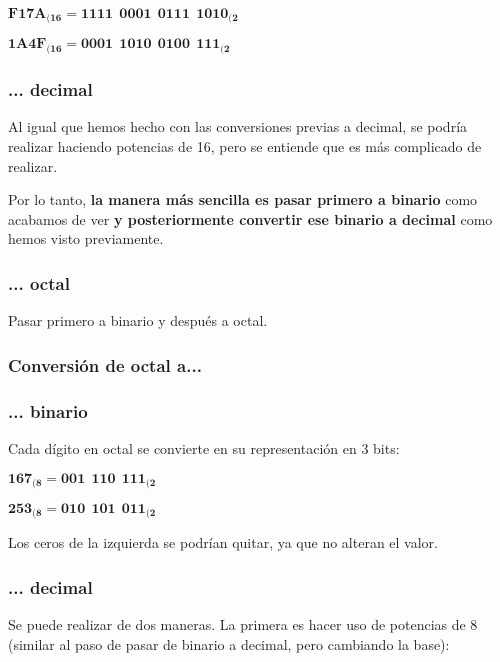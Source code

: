 \begin{center}
    \vspace{-15pt}
    $\mathbf{F17A_{(16} = 1111\ \ 0001\ \ 0111\ \ 1010_{(2}}$

    $\mathbf{1A4F_{(16} = 0001\ \ 1010\ \ 0100\ \ 111_{(2}}$
    \vspace{-15pt}
\end{center}


\subsubsection*{... decimal}
Al igual que hemos hecho con las conversiones previas a decimal, se podría realizar haciendo potencias de 16, pero se entiende que es más complicado de realizar.

Por lo tanto, \textbf{la manera más sencilla es pasar primero a binario} como acabamos de ver \textbf{y posteriormente convertir ese binario a decimal} como hemos visto previamente.

\subsubsection*{... octal}
Pasar primero a binario y después a octal.



\subsubsection{Conversión de octal a...}
\subsubsection*{... binario}
Cada dígito en octal se convierte en su representación en 3 bits:

\begin{center}
    \vspace{-15pt}
    $\mathbf{167_{(8} = 001\ \ 110\ \ 111_{(2}}$

    $\mathbf{253_{(8} = 010\ \ 101\ \ 011_{(2}}$
    \vspace{-15pt}
\end{center}
Los ceros de la izquierda se podrían quitar, ya que no alteran el valor.

\subsubsection*{... decimal}
Se puede realizar de dos maneras. La primera es hacer uso de potencias de 8 (similar al paso de pasar de binario a decimal, pero cambiando la base):

